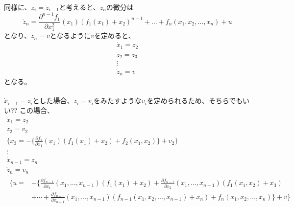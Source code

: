 \documentclass{jsarticle}
\begin{document}
同様に、$z_i = \dot{z}_{i-1}$と考えると、$z_{n}$の微分は
\begin{equation}
  \dot{z}_{n} =  \frac{\partial^{n-1}f_1}{\partial x_1^2}(x_1)( f_1(x_1) + x_2)^{n-1} +\dots + f_n(x_1,x_2,\dots,x_n)+u
\end{equation}
となり、$\dot{z}_n = v$となるように$v$を定めると、
\begin{equation}
  \begin{array}{c}
    \dot{x}_1 = z_2\\
    \dot{z}_2 = z_3\\
    \vdots\\
    \dot{z}_n = v
  \end{array}
\end{equation}
となる。
\;\\
\;\\
$\dot{x}_{i-1} = z_{i}$とした場合、$z_{i} = v_{i}$をみたすような$v_i$を定められるため、そちらでもいい??
この場合、
\begin{equation}
  \begin{array}{c}
    \dot{x}_1 = z_2\\
    \dot{z}_2 = v_2\\
    \{x_3 =  -\{ \frac{\partial f_1}{\partial x_1}(x_1)( f_1(x_1) + x_2)+f_2(x_1,x_2) \}+v_2 \}\\
    \vdots\\
    \dot{x}_{n-1} = z_n\\
    \dot{z}_n = v_n\\
    \begin{aligned}
      \{u = &-\{\frac{\partial f_{n-1}}{\partial x_1}(x_1,\dots,x_{n-1})(f_1(x_1)+x_2)
      + \frac{\partial f_{n-1}}{\partial x_2}(x_1,\dots,x_{n-1})(f_1(x_1,x_2)+x_3)
      \\
      & +\cdots +
      \frac{\partial f_{n-1}}{\partial x_{n-1}}(x_1,\dots,x_{n-1})(f_{n-1}(x_1,x_2,\dots,x_{n-1})+x_n)
      + f_n(x_1,x_2,\dots,x_n)\} + v\}\\
    \end{aligned}
  \end{array}
\end{equation}
\end{document}
